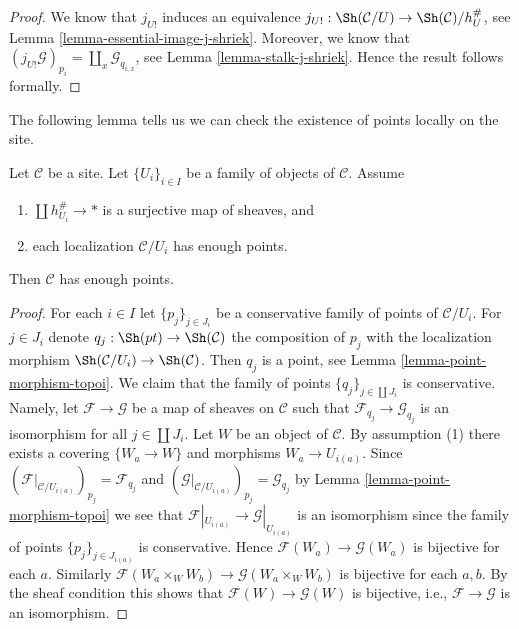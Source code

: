 \begin{proof}
We know that $j_{U!}$ induces an equivalence
$j_{U!} : \Sh(\mathcal{C}/U) \to \Sh(\mathcal{C})/h_U^\#$, see
Lemma \ref{lemma-essential-image-j-shriek}.
Moreover, we know that
$(j_{U!}\mathcal{G})_{p_i} = \coprod_x \mathcal{G}_{q_{i, x}}$, see
Lemma \ref{lemma-stalk-j-shriek}.
Hence the result follows formally.
\end{proof}

\noindent
The following lemma tells us we can check the existence of points
locally on the site.

\begin{lemma}
\label{lemma-enough-points-local}
Let $\mathcal{C}$ be a site. Let $\{U_i\}_{i \in I}$ be a family of
objects of $\mathcal{C}$. Assume
\begin{enumerate}
\item $\coprod h_{U_i}^\# \to *$ is a surjective map of sheaves, and
\item each localization $\mathcal{C}/U_i$ has enough points.
\end{enumerate}
Then $\mathcal{C}$ has enough points.
\end{lemma}

\begin{proof}
For each $i \in I$ let $\{p_j\}_{j \in J_i}$ be a conservative
family of points of $\mathcal{C}/U_i$. For $j \in J_i$ denote
$q_j : \Sh(pt) \to \Sh(\mathcal{C})$ the composition
of $p_j$ with the localization morphism
$\Sh(\mathcal{C}/U_i) \to \Sh(\mathcal{C})$.
Then $q_j$ is a point, see
Lemma \ref{lemma-point-morphism-topoi}.
We claim that the family of points $\{q_j\}_{j \in \coprod J_i}$
is conservative.
Namely, let $\mathcal{F} \to \mathcal{G}$ be a map of sheaves
on $\mathcal{C}$ such that $\mathcal{F}_{q_j} \to \mathcal{G}_{q_j}$
is an isomorphism for all $j \in \coprod J_i$.
Let $W$ be an object of $\mathcal{C}$.
By assumption (1) there exists a covering $\{W_a \to W\}$ and
morphisms $W_a \to U_{i(a)}$.
Since $(\mathcal{F}|_{\mathcal{C}/U_{i(a)}})_{p_j} = \mathcal{F}_{q_j}$
and $(\mathcal{G}|_{\mathcal{C}/U_{i(a)}})_{p_j} = \mathcal{G}_{q_j}$ by
Lemma \ref{lemma-point-morphism-topoi}
we see that
$\mathcal{F}|_{U_{i(a)}} \to \mathcal{G}|_{U_{i(a)}}$ is an isomorphism
since the family of points $\{p_j\}_{j \in J_{i(a)}}$ is conservative.
Hence $\mathcal{F}(W_a) \to \mathcal{G}(W_a)$ is bijective for each $a$.
Similarly $\mathcal{F}(W_a \times_W W_b) \to \mathcal{G}(W_a \times_W W_b)$
is bijective for each $a, b$.
By the sheaf condition this shows that
$\mathcal{F}(W) \to \mathcal{G}(W)$ is bijective, i.e.,
$\mathcal{F} \to \mathcal{G}$ is an isomorphism.
\end{proof}

